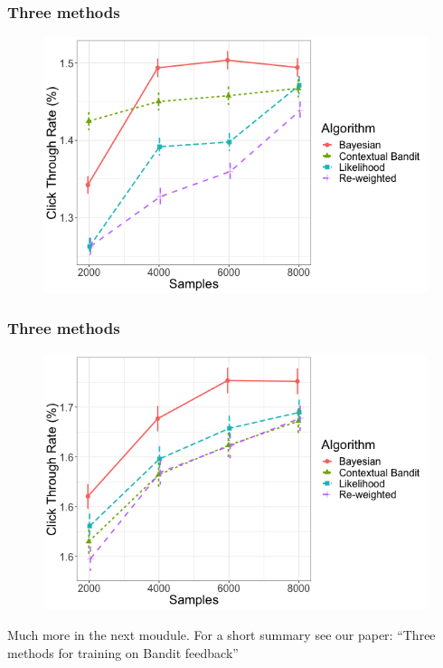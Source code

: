 \begin{frame}
  \frametitle{Three methods}
\begin{figure}[h!]
\includegraphics[scale=0.45]{images/pop_sampling_run.png}
\centering
\end{figure}


\end{frame}



\begin{frame}
  \frametitle{Three methods}
\begin{figure}[h!]
\includegraphics[scale=0.45]{images/inv_pop_sampling_run.png}
\centering
\end{figure}

Much more in the next moudule.  For a short summary see our paper: ``Three methods for training on Bandit feedback''

\end{frame}





